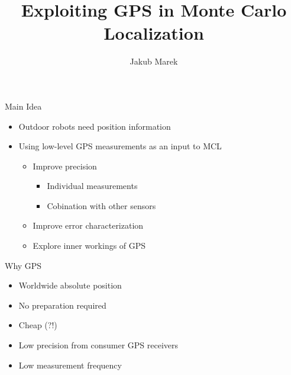 \documentclass[utf8]{beamer}
\title{Exploiting GPS in Monte Carlo Localization}
\author{Jakub Marek}
\newcommand{\imageframe}[2]{{
\setbeamertemplate{background}{
    \vbox to \paperheight{\vfil\hbox to \paperwidth{\hfil
    \texttt{[image: \#1]}
    \hfil}\vfil}
    }
\setbeamercolor{background canvas}{bg=#2}
\begin{frame}[plain]
\end{frame}
}}
\begin{document}
\begin{frame}[plain]
    \titlepage
\end{frame}

\begin{frame}{Main Idea}
    \begin{itemize}
        \item Outdoor robots need position information
        \item Using low-level GPS measurements as an input to MCL
        \begin{itemize}
            \item Improve precision
            \begin{itemize}
                \item Individual measurements
                \item Cobination with other sensors
            \end{itemize}
            \item Improve error characterization
            \item Explore inner workings of GPS
        \end{itemize}
    \end{itemize}
\end{frame}


\begin{frame}{Why GPS}
    \begin{itemize}
        \item Worldwide absolute position
        \item No preparation required
        \item Cheap (?!)
    \end{itemize}

    \begin{itemize}
        \item Low precision from consumer GPS receivers
        \item Low measurement frequency
    \end{itemize}
\end{frame}
\end{document}
